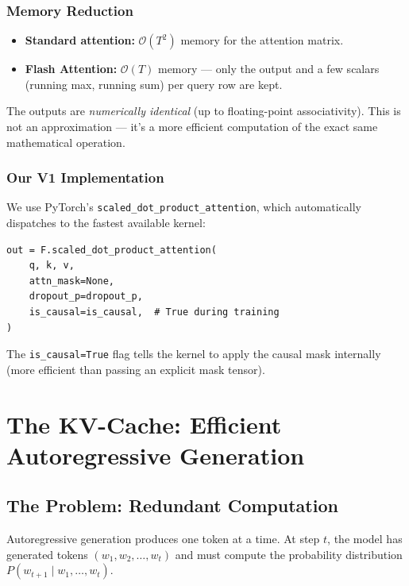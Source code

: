 \documentclass[11pt, a4paper]{article}
\theoremstyle{definition}
\begin{document}
\subsubsection{Memory Reduction}

\begin{itemize}
    \item \textbf{Standard attention:} $\mathcal{O}(T^2)$ memory for the attention matrix.
    \item \textbf{Flash Attention:} $\mathcal{O}(T)$ memory — only the output and a few scalars (running max, running sum) per query row are kept.
\end{itemize}

The outputs are \emph{numerically identical} (up to floating-point associativity). This is not an approximation — it's a more efficient computation of the exact same mathematical operation.

\subsubsection{Our V1 Implementation}

We use PyTorch's \texttt{scaled\_dot\_product\_attention}, which automatically dispatches to the fastest available kernel:
\begin{lstlisting}
out = F.scaled_dot_product_attention(
    q, k, v,
    attn_mask=None,
    dropout_p=dropout_p,
    is_causal=is_causal,  # True during training
)
\end{lstlisting}
The \texttt{is\_causal=True} flag tells the kernel to apply the causal mask internally (more efficient than passing an explicit mask tensor).

\section{The KV-Cache: Efficient Autoregressive Generation}

\subsection{The Problem: Redundant Computation}

Autoregressive generation produces one token at a time. At step $t$, the model has generated tokens $(w_1, w_2, \ldots, w_t)$ and must compute the probability distribution $P(w_{t+1} \mid w_1, \ldots, w_t)$.
\end{document}
